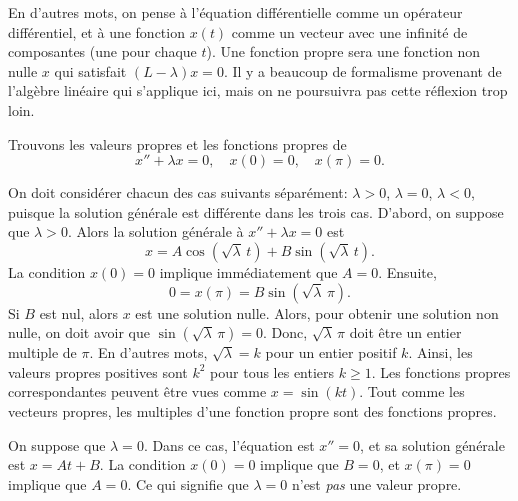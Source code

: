 En d'autres mots, on pense à l'équation différentielle comme un opérateur différentiel, et à une fonction $x(t)$
comme un vecteur avec une infinité de composantes (une pour chaque $t$).
Une fonction propre sera une fonction non nulle $x$ qui satisfait  
$(L- \lambda)x = 0$. Il y a beaucoup de formalisme provenant de l'algèbre linéaire qui s'applique ici, mais on ne poursuivra pas cette réflexion trop loin.  

\begin{example} \label{bvp:eig1ex}
Trouvons les valeurs propres et les fonctions propres de 
\begin{equation*}
x'' + \lambda x = 0, \quad x(0) = 0, \quad x(\pi) = 0 .
\end{equation*}

On doit considérer chacun des cas suivants séparément: $\lambda > 0$, $\lambda = 0$, $\lambda < 0$, puisque la solution générale est différente dans les trois cas.
D'abord, on suppose que $\lambda > 0$.  Alors la solution générale à $x''+\lambda x = 0$ est
\begin{equation*}
x = A \cos ( \sqrt{\lambda}\, t) + B \sin ( \sqrt{\lambda}\, t).
\end{equation*}
La condition $x(0) = 0$ implique immédiatement que $A = 0$.
Ensuite,
\begin{equation*}
0 = x(\pi) = B \sin ( \sqrt{\lambda}\, \pi ) .
\end{equation*}
Si $B$ est nul, alors $x$ est une solution nulle. Alors, pour obtenir une solution non nulle, on doit avoir que $\sin ( \sqrt{\lambda}\, \pi) = 0$.  Donc,
$\sqrt{\lambda}\, \pi$ doit être un entier multiple de $\pi$.  En d'autres mots,
 $\sqrt{\lambda} = k$ pour un entier positif $k$.
Ainsi, les valeurs propres positives sont 
$k^2$ pour tous les entiers $k \geq 1$.  Les fonctions propres correspondantes peuvent être vues comme $x=\sin (k t)$.  Tout comme les vecteurs propres, les multiples d'une fonction propre sont des fonctions propres. 

On suppose que $\lambda = 0$.  Dans ce cas, l'équation est $x'' = 0$,
et sa solution générale est $x = At + B$.  La condition  $x(0) = 0$ implique que 
 $B=0$, et $x(\pi) = 0$ implique que $A = 0$. Ce qui signifie que $\lambda
= 0$ n'est \emph{pas} une valeur propre.


\end{example}
